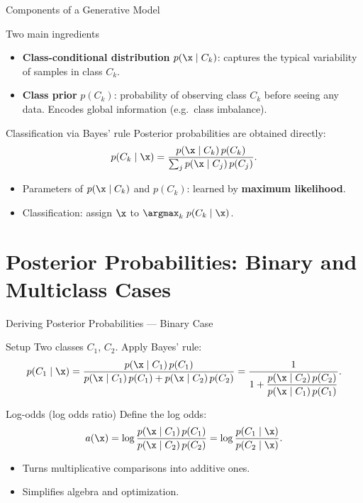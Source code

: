 \begin{frame}{Components of a Generative Model}
  \begin{block}{Two main ingredients}
    \begin{itemize}
      \item \textbf{Class-conditional distribution} $p(\x\mid C_k)$: captures the typical variability
            of samples in class $C_k$.
      \item \textbf{Class prior} $p(C_k)$: probability of observing class $C_k$ before seeing any data.
            Encodes global information (e.g.\ class imbalance).
    \end{itemize}
  \end{block}

  \begin{block}{Classification via Bayes' rule}
    Posterior probabilities are obtained directly:
    \[
      p(C_k\mid\x)=\frac{p(\x\mid C_k)\,p(C_k)}{\sum_j p(\x\mid C_j)\,p(C_j)}.
    \]
    \begin{itemize}
      \item Parameters of $p(\x\mid C_k)$ and $p(C_k)$: learned by \textbf{maximum likelihood}.
      \item Classification: assign $\x$ to $\argmax_k\; p(C_k\mid\x)$.
    \end{itemize}
  \end{block}
\end{frame}

\section{Posterior Probabilities: Binary and Multiclass Cases}

\begin{frame}{Deriving Posterior Probabilities — Binary Case}
  \begin{block}{Setup}
    Two classes $C_1$, $C_2$.  Apply Bayes' rule:
    \[
      p(C_1\mid\x)=\frac{p(\x\mid C_1)\,p(C_1)}{p(\x\mid C_1)\,p(C_1)+p(\x\mid C_2)\,p(C_2)}
      =\frac{1}{1+\dfrac{p(\x\mid C_2)\,p(C_2)}{p(\x\mid C_1)\,p(C_1)}}.
    \]
  \end{block}

  \begin{block}{Log-odds (log odds ratio)}
    Define the \alert{log odds}:
    \[
      a(\x)=\log\frac{p(\x\mid C_1)\,p(C_1)}{p(\x\mid C_2)\,p(C_2)}
      =\log\frac{p(C_1\mid\x)}{p(C_2\mid\x)}.
    \]
    \begin{itemize}
      \item Turns multiplicative comparisons into additive ones.
      \item Simplifies algebra and optimization.
    \end{itemize}
  \end{block}
\end{frame}

